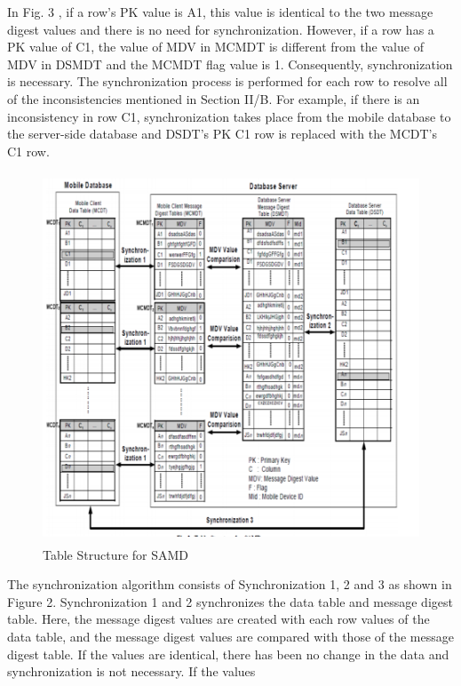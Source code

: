 \documentclass[conference]{IEEEtran}
\begin{document}
\begin{enumerate}[label=(\Alph*)]

In Fig. 3 , if a row's PK value is A1, this value is identical to the two message digest values and there is no need for synchronization. However, if a row has a PK value of C1, the value of MDV in MCMDT is different from the value of MDV in DSMDT and the MCMDT flag value is 1. Consequently, synchronization is necessary. The synchronization process is performed for each row to resolve all of the inconsistencies mentioned in Section II/B. For
example, if there is an inconsistency in row C1, synchronization takes place from the mobile database to the server-side database and DSDT's PK C1 row is replaced with the MCDT's C1 row.

\begin{figure}[h]
	\centering
	\includegraphics[trim={0.66cm 0.1cm 1.2cm 0.1cm},clip, width=0.9\linewidth, height=11cm]{explain.png} 
	\caption{Table Structure for SAMD}
	\label{fig:explain1}
\end{figure}



The synchronization algorithm consists of Synchronization 1, 2 and 3 as shown in Figure 2. Synchronization 1 and 2 synchronizes the data table and message digest table. Here, the message digest values are created with each row values of the data table, and the message digest values are compared with those of the message digest table. If the values are identical, there has been no change in the data and synchronization is not necessary. If the values 



\end{enumerate}
\end{document}
